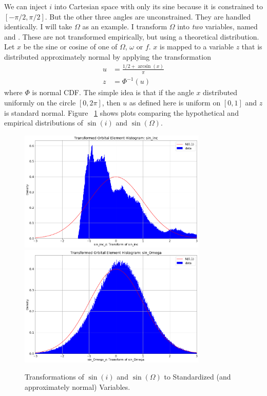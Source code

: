 We can inject $i$ into Cartesian space with only its sine because it is constrained to $[-\pi/2, \pi/2]$.
But the other three angles are unconstrained.  
They are handled identically.
I will take $\Omega$ as an example.
I transform $\Omega$ into \textit{two} variables, named  and .
These are not transformed empirically, but using a theoretical distribution.
Let $x$ be the sine or cosine of one of $\Omega$, $\omega$ or $f$.
$x$ is mapped to a variable $z$ that is distributed approximately normal by applying the transformation
\begin{align*}
u &= \frac{1/2 + \arcsin(x)}{\pi} \\
z &= \Phi^{-1}(u)
\end{align*}
where $\Phi$ is normal CDF.
The simple idea is that if the angle $x$ distributed uniformly on the circle $[0, 2 \pi]$, 
then $u$ as defined here is uniform on $[0,1]$ and $z$ is standard normal.
Figure ~\ref{fig:elt_standardize_inc_omega} shows plots comparing the hypothetical and empirical distributions of $\sin(i)$ and $\sin(\Omega)$.
\begin{figure}[hbt!]
\begin{center}
\includegraphics[width=0.8\textwidth]{../figs/elts_cov/sin_inc_z.png}
\includegraphics[width=0.8\textwidth]{../figs/elts_cov/sin_Omega_z.png}
\end{center}
\caption[Transformations of $\sin(i)$ and $\sin(\Omega)$ to Standardized Variables.]
{Transformations of $\sin(i)$ and $\sin(\Omega)$ to Standardized (and approximately normal) Variables.}
\label{fig:elt_standardize_inc_omega}
\end{figure}
